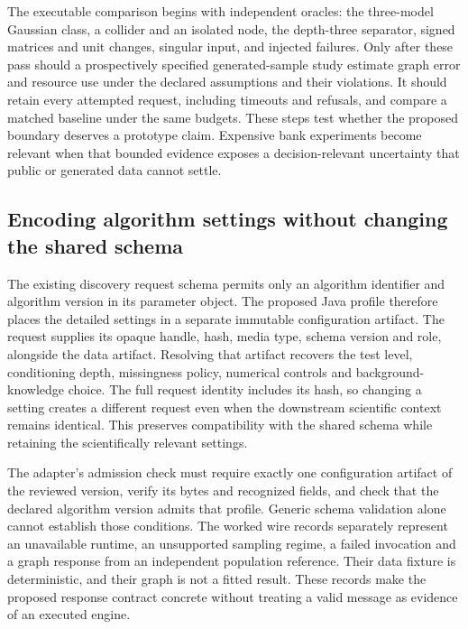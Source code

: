 The executable comparison begins with independent oracles: the
three-model Gaussian class, a collider and an isolated node, the
depth-three separator, signed matrices and unit changes, singular input,
and injected failures. Only after these pass should a prospectively
specified generated-sample study estimate graph error and resource use
under the declared assumptions and their violations. It should retain
every attempted request, including timeouts and refusals, and compare a
matched baseline under the same budgets. These steps test whether the
proposed boundary deserves a prototype claim. Expensive bank experiments
become relevant when that bounded evidence exposes a decision-relevant
uncertainty that public or generated data cannot settle.
\label{exec13:java-adapter-end}

\hypertarget{encoding-algorithm-settings-without-changing-the-shared-schema}{%
\subsection{Encoding algorithm settings without changing the shared
schema}\label{encoding-algorithm-settings-without-changing-the-shared-schema}}

The existing discovery request schema permits only an algorithm
identifier and algorithm version in its parameter object. The proposed
Java profile therefore places the detailed settings in a separate
immutable configuration artifact. The request supplies its opaque
handle, hash, media type, schema version and role, alongside the data
artifact. Resolving that artifact recovers the test level, conditioning
depth, missingness policy, numerical controls and background-knowledge
choice. The full request identity includes its hash, so changing a
setting creates a different request even when the downstream scientific
context remains identical. This preserves compatibility with the shared
schema while retaining the scientifically relevant settings.
\citep{exec13_java_adapter_contract}

The adapter's admission check must require exactly one configuration
artifact of the reviewed version, verify its bytes and recognized
fields, and check that the declared algorithm version admits that
profile. Generic schema validation alone cannot establish those
conditions. The worked wire records separately represent an unavailable
runtime, an unsupported sampling regime, a failed invocation and a graph
response from an independent population reference. Their data fixture is
deterministic, and their graph is not a fitted result. These records
make the proposed response contract concrete without treating a valid
message as evidence of an executed engine. \label{exec13:java-wire-end}
